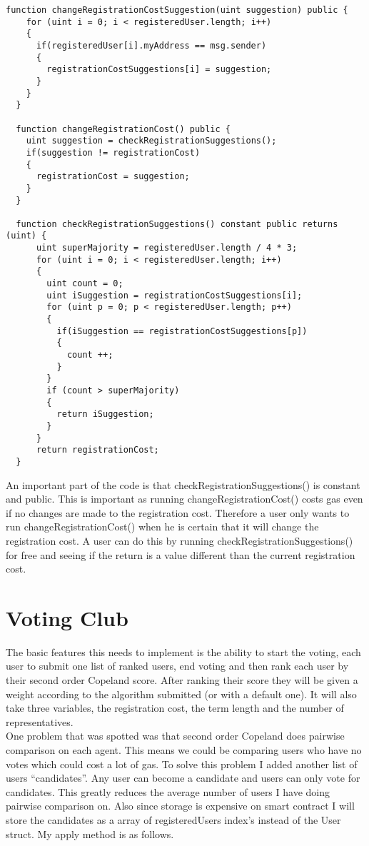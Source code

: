 \begin{lstlisting}
function changeRegistrationCostSuggestion(uint suggestion) public {
    for (uint i = 0; i < registeredUser.length; i++)
    {
      if(registeredUser[i].myAddress == msg.sender)
      {
        registrationCostSuggestions[i] = suggestion;
      }
    }
  }

  function changeRegistrationCost() public {
    uint suggestion = checkRegistrationSuggestions();
    if(suggestion != registrationCost)
    {
      registrationCost = suggestion;
    }
  }

  function checkRegistrationSuggestions() constant public returns (uint) {
      uint superMajority = registeredUser.length / 4 * 3;
      for (uint i = 0; i < registeredUser.length; i++)
      {
        uint count = 0;
        uint iSuggestion = registrationCostSuggestions[i];
        for (uint p = 0; p < registeredUser.length; p++)
        {
          if(iSuggestion == registrationCostSuggestions[p])
          {
            count ++;
          }
        }
        if (count > superMajority)
        {
          return iSuggestion;
        }
      }
      return registrationCost;
  }
\end{lstlisting}
An important part of the code is that checkRegistrationSuggestions() is constant and public. This is important as running changeRegistrationCost() costs gas even if no changes are made to the registration cost. Therefore a user only wants to run changeRegistrationCost() when he is certain that it will change the registration cost. A user can do this by running checkRegistrationSuggestions() for free and seeing if the return is a value different than the current registration cost.
\section{Voting Club}
The basic features this needs to implement is the ability to start the voting, each user to submit one list of ranked users, end voting and then rank each user by their second order Copeland score. After ranking their score they will be given a weight according to the algorithm submitted (or with a default one). It will also take three variables, the registration cost, the term length and the number of representatives. \\
One problem that was spotted was that second order Copeland does pairwise comparison on each agent. This means we could be comparing users who have no votes which could cost a lot of gas. To solve this problem I added another list of users “candidates”. Any user can become a candidate and users can only vote for candidates. This greatly reduces the average number of users I have doing pairwise comparison on. Also since storage is expensive on smart contract I will store the candidates as a array of registeredUsers index’s instead of the User struct. My apply method is as follows.


